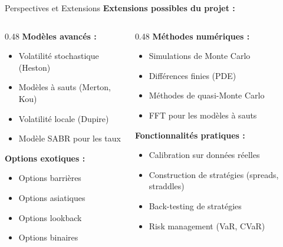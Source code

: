 \documentclass[aspectratio=169, 10pt]{beamer}
\begin{document}
\begin{frame}{Perspectives et Extensions}
    \textbf{Extensions possibles du projet :}
    
    \begin{columns}[T]
        \begin{column}{0.48\textwidth}
            \textbf{Modèles avancés :}
            \begin{itemize}
                \item Volatilité stochastique (Heston)
                \item Modèles à sauts (Merton, Kou)
                \item Volatilité locale (Dupire)
                \item Modèle SABR pour les taux
            \end{itemize}
            
            \vspace{0.3cm}
            \textbf{Options exotiques :}
            \begin{itemize}
                \item Options barrières
                \item Options asiatiques
                \item Options lookback
                \item Options binaires
            \end{itemize}
        \end{column}
        \begin{column}{0.48\textwidth}
            \textbf{Méthodes numériques :}
            \begin{itemize}
                \item Simulations de Monte Carlo
                \item Différences finies (PDE)
                \item Méthodes de quasi-Monte Carlo
                \item FFT pour les modèles à sauts
            \end{itemize}
            
            \vspace{0.3cm}
            \textbf{Fonctionnalités pratiques :}
            \begin{itemize}
                \item Calibration sur données réelles
                \item Construction de stratégies (spreads, straddles)
                \item Back-testing de stratégies
                \item Risk management (VaR, CVaR)
            \end{itemize}
        \end{column}
    \end{columns}
\end{frame}
\end{document}
